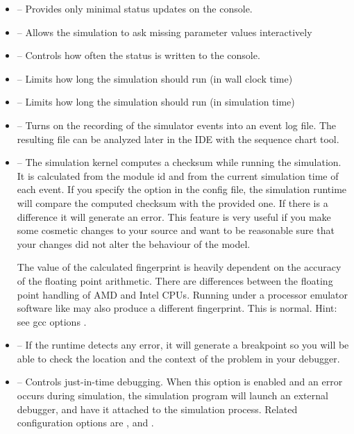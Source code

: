 \begin{itemize}
  \item {} -- Provides only minimal status updates on the console.
  \item {} -- Allows the simulation to ask missing parameter values interactively
  \item {} -- Controls how often the status is written to the console.
  \item {} -- Limits how long the simulation should run (in wall clock time)
  \item {} -- Limits how long the simulation should run (in simulation time)
  \item {} -- Turns on the recording of the simulator events into an event log file.
           The resulting  file can be analyzed later in the IDE with the sequence chart tool.
  \item {} -- The simulation kernel computes a checksum while running the simulation.
          It is calculated from the module id and from the current simulation time of each event.
          If you specify the  option in the config file, the simulation runtime will
          compare the computed checksum with the provided one. If there is a difference it will
          generate an error. This feature is very useful if you make some cosmetic changes to your
          source and want to be reasonable sure that your changes did not alter the behaviour
          of the model.
          \begin{warning}
          The value of the calculated fingerprint is heavily dependent on the accuracy of the floating
          point arithmetic. There are differences between the floating point handling of AMD and Intel CPUs.
          Running under a processor emulator software like  may also produce
          a different fingerprint. This is normal. Hint: see gcc options .
          \end{warning}
  \item {} -- If the runtime detects any error, it will generate a breakpoint
          so you will be able to check the location and the context of the problem in your debugger.
  \item {} -- Controls just-in-time debugging. When this option is enabled
          and an error occurs during simulation, the simulation program will launch an external debugger,
          and have it attached to the simulation process. Related configuration options are
          ,  and
          .
\end{itemize}

